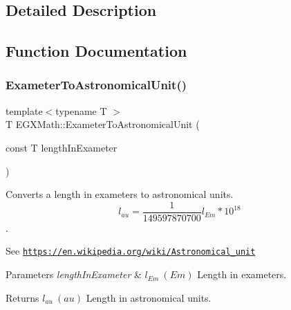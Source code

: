 \subsection{Detailed Description}


\subsection{Function Documentation}
\mbox{\label{group___e_g_x_math-_conversions-_length_conversions-_s_i-_exameter-_astronomical_gafe75957564bfe2508c37089fece97c41}} 
\subsubsection{\texorpdfstring{Exameter\+To\+Astronomical\+Unit()}{ExameterToAstronomicalUnit()}}
{\footnotesize\ttfamily template$<$typename T $>$ \\
T E\+G\+X\+Math\+::\+Exameter\+To\+Astronomical\+Unit (\begin{DoxyParamCaption}\item[{const T}]{length\+In\+Exameter }\end{DoxyParamCaption})}



Converts a length in exameters to astronomical units. \[ l_{au}= \frac{1}{149597870700} l_{Em} * 10^{18} \]. 

See \href{https://en.wikipedia.org/wiki/Astronomical_unit}{\tt https\+://en.\+wikipedia.\+org/wiki/\+Astronomical\+\_\+unit} 
\begin{DoxyParams}{Parameters}
{\em length\+In\+Exameter} & $ l_{Em}\ (Em)$ Length in exameters. \\
\hline
\end{DoxyParams}
\begin{DoxyReturn}{Returns}
$ l_{au}\ (au)$ Length in astronomical units. 
\end{DoxyReturn}
\mbox{\label{group___e_g_x_math-_conversions-_length_conversions-_s_i-_exameter-_astronomical_ga3867a3c149542e86e92d12147fd6d34e}} 
